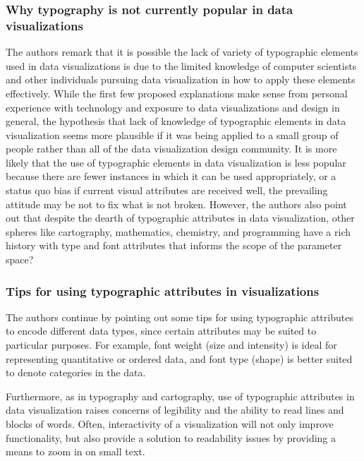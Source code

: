 \documentclass[]{book}
\theoremstyle{definition}
\theoremstyle{definition}
\theoremstyle{definition}
\theoremstyle{remark}
\begin{document}
\subsubsection{Why typography is not currently popular in data
visualizations}\label{why-typography-is-not-currently-popular-in-data-visualizations}

The authors remark that it is possible the lack of variety of
typographic elements used in data visualizations is due to the limited
knowledge of computer scientists and other individuals pursuing data
visualization in how to apply these elements effectively. While the
first few proposed explanations make sense from personal experience with
technology and exposure to data visualizations and design in general,
the hypothesis that lack of knowledge of typographic elements in data
visualization seems more plausible if it was being applied to a small
group of people rather than all of the data visualization design
community. It is more likely that the use of typographic elements in
data visualization is less popular because there are fewer instances in
which it can be used appropriately, or a status quo bias if current
visual attributes are received well, the prevailing attitude may be not
to fix what is not broken. However, the authors also point out that
despite the dearth of typographic attributes in data visualization,
other spheres like cartography, mathematics, chemistry, and programming
have a rich history with type and font attributes that informs the scope
of the parameter space?

\subsubsection{Tips for using typographic attributes in
visualizations}\label{tips-for-using-typographic-attributes-in-visualizations}

The authors continue by pointing out some tips for using typographic
attributes to encode different data types, since certain attributes may
be suited to particular purposes. For example, font weight (size and
intensity) is ideal for representing quantitative or ordered data, and
font type (shape) is better suited to denote categories in the data.

Furthermore, as in typography and cartography, use of typographic
attributes in data visualization raises concerns of legibility and the
ability to read lines and blocks of words. Often, interactivity of a
visualization will not only improve functionality, but also provide a
solution to readability issues by providing a means to zoom in on small
text.
\end{document}
